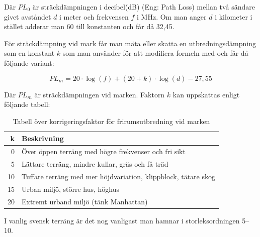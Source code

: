Där $PL_{0}$ är sträckdämpningen i decibel(dB) (Eng: Path Loss) mellan två
sändare givet avståndet $d$ i meter och frekvensen $f$ i MHz. Om man anger $d$
i kilometer i stället adderar man 60 till konstanten och får då 32,45.

För sträckdämpning vid mark får man mäta eller skatta en utbredningsdämpning
som en konstant $k$ som man använder för att modifiera formeln med och får då
följande variant:


\begin{equation}
	PL_m = 20 \cdot \log(f) + (20+k) \cdot \log(d) - 27,55
\end{equation}

Där $PL_m$ är sträckdämpningen vid marken. Faktorn $k$ kan uppskattas enligt
följande tabell:

\begin{table}[H]
	\begin{centering}
		\begin{tabular}{r|l}
			\textbf{k} & \textbf{Beskrivning} \\ \hline
			0 & Över öppen terräng med högre frekvenser och fri sikt\\
			5 & Lättare terräng, mindre kullar, gräs och få träd \\
			10 & Tuffare terräng med mer höjdvariation, klippblock, tätare skog \\
			15 & Urban miljö, större hus, höghus \\
			20 & Extremt urband miljö (tänk Manhattan)\\
		\end{tabular}
	\end{centering}
	\label{tab:frirum-faktor}
	\caption{Tabell över korrigeringsfaktor för frirumsutbredning vid marken}
\end{table}

I vanlig svensk terräng är det nog vanligast man hamnar i storleksordningen
5--10.


